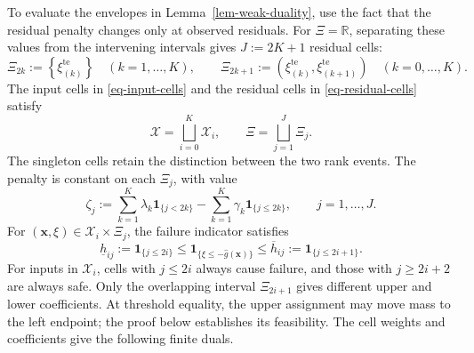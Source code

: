 \documentclass[review,11pt,3p,authoryear,nopreprintline]{elsarticle}
\begin{document}
To evaluate the envelopes in Lemma~\ref{lem-weak-duality}, use the fact that the residual penalty changes only at observed residuals. For $\Xi=\mathbb R$, separating these values from the intervening intervals gives $J:=2K+1$ residual cells:
\begin{equation}
  \Xi_{2k}:=\left\{\xi_{(k)}^{\mathrm{te}}\right\}
    \quad\left(k=1,\ldots,K\right),
  \qquad
  \Xi_{2k+1}:=\left(\xi_{(k)}^{\mathrm{te}},\xi_{(k+1)}^{\mathrm{te}}\right)
    \quad\left(k=0,\ldots,K\right).
  \label{eq-residual-cells}
\end{equation}
The input cells in \eqref{eq-input-cells} and the residual cells in \eqref{eq-residual-cells} satisfy
\begin{equation*}
  \mathcal X=\bigsqcup_{i=0}^K\mathcal X_i,
  \qquad
  \Xi=\bigsqcup_{j=1}^J\Xi_j.
\end{equation*}
The singleton cells retain the distinction between the two rank events. The penalty is constant on each $\Xi_j$, with value
\begin{equation}
  \zeta_j:=\sum_{k=1}^K\lambda_k\mathbf1_{\{j<2k\}}
    -\sum_{k=1}^K\gamma_k\mathbf1_{\{j\le2k\}},
    \qquad j=1,\ldots,J.
  \label{eq-dual-cell-values}
\end{equation}
For $(\bm x,\xi)\in\mathcal X_i\times\Xi_j$, the failure indicator satisfies
\begin{equation}
  \underline h_{ij}:=\mathbf1_{\{j\le2i\}}
  \le\mathbf1_{\{\xi\le-\hat g(\bm x)\}}
  \le\overline h_{ij}:=\mathbf1_{\{j\le2i+1\}}.
  \label{eq-cell-costs}
\end{equation}
For inputs in $\mathcal X_i$, cells with $j\le2i$ always cause failure, and those with $j\ge2i+2$ are always safe. Only the overlapping interval $\Xi_{2i+1}$ gives different upper and lower coefficients. At threshold equality, the upper assignment may move mass to the left endpoint; the proof below establishes its feasibility. The cell weights and coefficients give the following finite duals.
\end{document}
